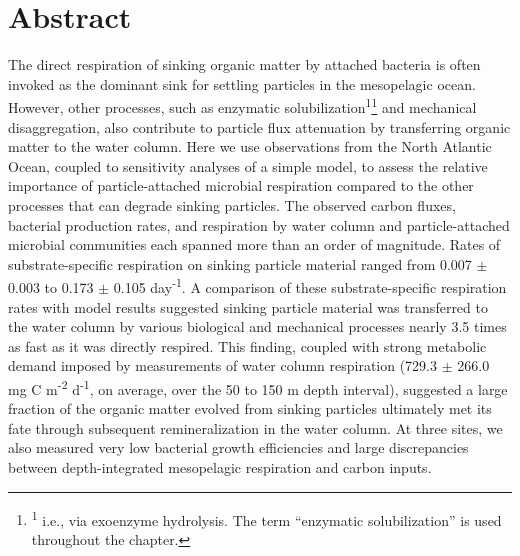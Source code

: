 \section{Abstract}
The direct respiration of sinking organic matter by attached bacteria is often invoked as the dominant sink for settling particles in the mesopelagic ocean. However, other processes, such as enzymatic solubilization\textsuperscript{1}\let\thefootnote\relax\footnote{{\setlength{\parindent}{0pt}\textsuperscript{1} i.e., via exoenzyme hydrolysis. The term ``enzymatic solubilization'' is used throughout the chapter.}} and mechanical disaggregation, also contribute to particle flux attenuation by transferring organic matter to the water column. Here we use observations from the North Atlantic Ocean, coupled to sensitivity analyses of a simple model, to assess the relative importance of particle-attached microbial respiration compared to the other processes that can degrade sinking particles. The observed carbon fluxes, bacterial production rates, and respiration by water column and particle-attached microbial communities each spanned more than an order of magnitude. Rates of substrate-specific respiration on sinking particle material ranged from 0.007 $\pm$ 0.003 to 0.173 $\pm$ 0.105 day\textsuperscript{-1}. A comparison of these substrate-specific respiration rates with model results suggested sinking particle material was transferred to the water column by various biological and mechanical processes nearly 3.5 times as fast as it was directly respired. This finding, coupled with strong metabolic demand imposed by measurements of water column respiration (729.3 $\pm$ 266.0 mg C m\textsuperscript{-2} d\textsuperscript{-1}, on average, over the 50 to 150 m depth interval), suggested a large fraction of the organic matter evolved from sinking particles ultimately met its fate through subsequent remineralization in the water column. At three sites, we also measured very low bacterial growth efficiencies and large discrepancies between depth-integrated mesopelagic respiration and carbon inputs.
\clearpage

